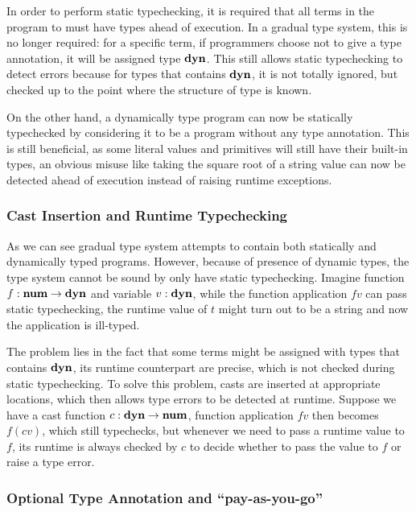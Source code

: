 In order to perform static typechecking, it is required that
all terms in the program to must have types ahead of execution.
In a gradual type system, this is no longer required:
for a specific term,
if programmers choose not to give a type annotation, it will be assigned type $\textbf{dyn}$.
This still allows static typechecking to detect errors because
for types that contains $\textbf{dyn}$, it is not totally ignored, but checked
up to the point where the structure of type is known.

On the other hand, a dynamically type program can now be statically typechecked
by considering it to be a program without any type annotation.
This is still beneficial, as some literal values and primitives will still have their built-in types,
an obvious misuse like taking the square root of a string value can now be detected ahead of execution
instead of raising runtime exceptions.

\subsubsection{Cast Insertion and Runtime Typechecking}

As we can see gradual type system attempts to contain both statically and dynamically typed programs.
However, because of presence of dynamic types,
the type system cannot be sound by only have static typechecking.
Imagine function $f : \textbf{num} \rightarrow \textbf{dyn}$ and variable $v : \textbf{dyn}$, while the function application
$f v$ can pass static typechecking, the runtime value of $t$ might turn out to be a string
and now the application is ill-typed.

The problem lies in the fact that some terms might be assigned with types that contains
$\textbf{dyn}$, its runtime counterpart are precise, which is not checked during static typechecking.
To solve this problem, casts are inserted at appropriate locations, which then
allows type errors to be detected at runtime.
Suppose we have a cast function $c : \textbf{dyn} \rightarrow \textbf{num}$, function application $f v$
then becomes $f (c v)$, which still typechecks, but whenever we need to pass a runtime value to $f$,
its runtime is always checked by $c$ to decide whether to pass the value to $f$ or raise
a type error.

\subsubsection{Optional Type Annotation and ``pay-as-you-go''}

